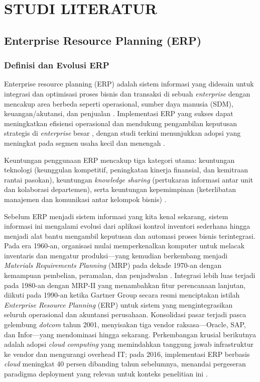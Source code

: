 \chapter{STUDI LITERATUR}
\label{chap:studi-literatur}

\section{Enterprise Resource Planning (ERP)}

\subsection{Definisi dan Evolusi ERP}

Enterprise resource planning (ERP) adalah sistem informasi yang didesain untuk integrasi dan optimisasi proses bisnis dan transaksi di sebuah \textit{enterprise} dengan mencakup area berbeda seperti operasional, sumber daya manusia (SDM), keuangan/akutansi, dan penjualan \cite{boza2015}. Implementasi ERP yang sukses dapat meningkatkan efisiensi operasional dan mendukung pengambilan keputusan strategis di \textit{enterprise} besar \cite{boza2015}, dengan studi terkini menunjukkan adopsi yang meningkat pada segmen usaha kecil dan menengah \cite{hasanah2024}.

Keuntungan penggunaan ERP mencakup tiga kategori utama: keuntungan teknologi (keunggulan kompetitif, peningkatan kinerja finansial, dan kemitraan rantai pasokan), keuntungan \textit{knowledge sharing} (pertukaran informasi antar unit dan kolaborasi departemen), serta keuntungan kepemimpinan (keterlibatan manajemen dan komunikasi antar kelompok bisnis) \cite{goldston2020evolution}.

Sebelum ERP menjadi sistem informasi yang kita kenal sekarang, sistem informasi ini mengalami evolusi dari aplikasi kontrol inventori sederhana hingga menjadi alat bantu mengambil keputusan dan automasi proses bisnis terintegrasi. Pada era 1960-an, organisasi mulai memperkenalkan komputer untuk melacak inventaris dan mengatur produksi—yang kemudian berkembang menjadi \textit{Materials Requirements Planning} (MRP) pada dekade 1970-an dengan kemampuan pembelian, peramalan, dan penjadwalan \cite{goldston2020evolution}. Integrasi lebih luas terjadi pada 1980-an dengan MRP-II yang menambahkan fitur perencanaan lanjutan, diikuti pada 1990-an ketika Gartner Group secara resmi menciptakan istilah \textit{Enterprise Resource Planning} (ERP) untuk sistem yang mengintegrasikan seluruh operasional dan akuntansi perusahaan. Konsolidasi pasar terjadi pasca gelembung \textit{dotcom} tahun 2001, menyisakan tiga vendor raksasa—Oracle, SAP, dan Infor—yang mendominasi hingga sekarang. Perkembangan krusial berikutnya adalah adopsi \textit{cloud computing} yang memindahkan tanggung jawab infrastruktur ke vendor dan mengurangi overhead IT; pada 2016, implementasi ERP berbasis \textit{cloud} meningkat 40 persen dibanding tahun sebelumnya, menandai pergeseran paradigma deployment yang relevan untuk konteks penelitian ini \cite{goldston2020evolution}.

